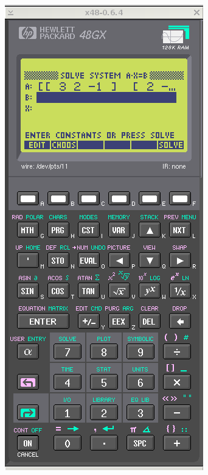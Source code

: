 \documentclass[11pt]{article}
\begin{document}
\includegraphics[scale,height=0.33\textheight]{20180422143232-linear01-p2.png}
~
\end{document}
